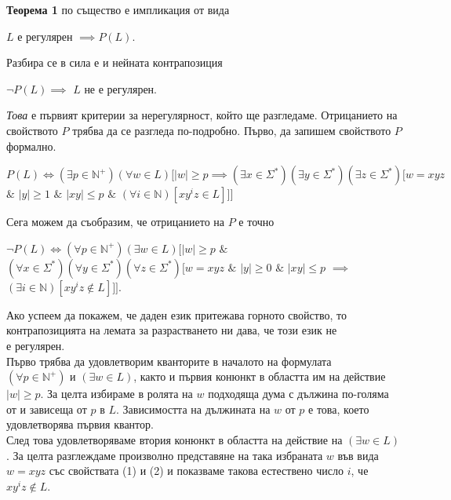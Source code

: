 \documentclass[openany]{book}
\begin{document}
    \hspace{15pt} \textbf{Теорема 1} по същество е импликация от вида 
    \begin{center}
        $L$ е регулярен $\implies P(L)$. 
    \end{center}
    Разбира се в сила е и нейната контрапозиция
    \begin{center}
        $\neg P(L) \implies$ $L$ не е регулярен.
    \end{center}
    \textit{Това} е първият критерии за нерегулярност, който ще разгледаме. Отрицанието
    на свойството $P$ трябва да се разгледа по-подробно. Първо, да запишем свойството
    $P$ формално.
    \begin{center} 
        $P(L) \iff (\exists p \in \mathbb{N}^+)(\forall w \in L)[|w| \geq p \implies (\exists x \in \Sigma^*)(\exists y \in \Sigma^*)(\exists z \in \Sigma^*)[w = xyz$ $\&$ $|y| \geq 1$ $\&$ $|xy| \leq p$ $\&$ $(\forall i \in \mathbb{N})[xy^iz \in L]]]$
    \end{center}
    Сега можем да съобразим, че отрицанието на $P$ е точно
    \begin{center}
        $\neg P(L) \iff (\forall p \in \mathbb{N}^+)(\exists w \in L) [|w| \geq p$ $\&$ $(\forall x \in \Sigma^*)(\forall y \in \Sigma^*)(\forall z \in \Sigma^*)[w = xyz$ $\&$ $|y| \geq 0$ $\&$ $|xy| \leq p$ $\implies$ $(\exists i \in \mathbb{N})[xy^iz \notin L]]]$.
    \end{center}

    Ако успеем да покажем, че даден език притежава горното свойство, то контрапозицията
    на лемата за разрастването ни дава, че този език не \\ е регулярен. \\
    \hspace{15pt} Първо трябва да 
    удовлетворим кванторите в началото на формулата \\ $\boxed{(\forall p \in \mathbb{N}^+)}$ и
    $\boxed{(\exists w \in L)}$, както и първия конюнкт в областта им на действие 
    $\boxed{|w| \geq p}$. За целта избираме в ролята на $w$ подходяща дума с дължина по-голяма от и зависеща от $p$
    в $L$. Зависимостта на дължината на $w$ от $p$ е това, което удовлетворява първия
    квантор. \\ 
    \hspace{15pt} След това удовлетворяваме втория конюнкт в областта на действие на  
    $\boxed{(\exists w \in L)}$. За целта разглеждаме произволно представяне на 
    така избраната $w$
    във вида $w = xyz$ със свойствата (1) и (2) и показваме такова естествено число $i$,
    че $xy^iz \notin L$.
\end{document}
